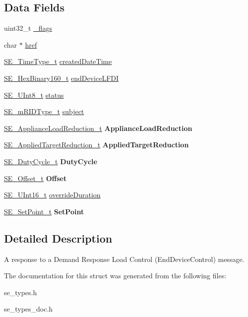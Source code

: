 \subsection*{Data Fields}
\begin{DoxyCompactItemize}
\item 
uint32\+\_\+t \hyperlink{group__DrResponse_ga3935b911a2459587ec94199037ab0e0b}{\+\_\+flags}
\item 
char $\ast$ \hyperlink{group__DrResponse_gad93328683bc0ae7951dd64d6d9ef75d6}{href}
\item 
\hyperlink{group__TimeType_ga6fba87a5b57829b4ff3f0e7638156682}{S\+E\+\_\+\+Time\+Type\+\_\+t} \hyperlink{group__DrResponse_gadaad04b0b35d8f1e04852a97853ff85a}{created\+Date\+Time}
\item 
\hyperlink{group__HexBinary160_ga92b92aa55555bdb75f3a59060f2c1632}{S\+E\+\_\+\+Hex\+Binary160\+\_\+t} \hyperlink{group__DrResponse_ga71a72ff947c30daf23717299c9bec0b4}{end\+Device\+L\+F\+DI}
\item 
\hyperlink{group__UInt8_gaf7c365a1acfe204e3a67c16ed44572f5}{S\+E\+\_\+\+U\+Int8\+\_\+t} \hyperlink{group__DrResponse_gacdaed09d4ca83cb5ca0c9a05403d075c}{status}
\item 
\hyperlink{group__mRIDType_gac74622112f3a388a2851b2289963ba5e}{S\+E\+\_\+m\+R\+I\+D\+Type\+\_\+t} \hyperlink{group__DrResponse_gac4dc2f090a45b58f5379fc0566b52b3e}{subject}
\item 
\hyperlink{structSE__ApplianceLoadReduction__t}{S\+E\+\_\+\+Appliance\+Load\+Reduction\+\_\+t} {\bfseries Appliance\+Load\+Reduction}
\item 
\hyperlink{structSE__AppliedTargetReduction__t}{S\+E\+\_\+\+Applied\+Target\+Reduction\+\_\+t} {\bfseries Applied\+Target\+Reduction}
\item 
\hyperlink{structSE__DutyCycle__t}{S\+E\+\_\+\+Duty\+Cycle\+\_\+t} {\bfseries Duty\+Cycle}
\item 
\hyperlink{structSE__Offset__t}{S\+E\+\_\+\+Offset\+\_\+t} {\bfseries Offset}
\item 
\hyperlink{group__UInt16_gac68d541f189538bfd30cfaa712d20d29}{S\+E\+\_\+\+U\+Int16\+\_\+t} \hyperlink{group__DrResponse_ga0a4b25f83bac9e055e0842839953b1da}{override\+Duration}
\item 
\hyperlink{structSE__SetPoint__t}{S\+E\+\_\+\+Set\+Point\+\_\+t} {\bfseries Set\+Point}
\end{DoxyCompactItemize}


\subsection{Detailed Description}
A response to a Demand Response Load Control (End\+Device\+Control) message. 

The documentation for this struct was generated from the following files\+:\begin{DoxyCompactItemize}
\item 
se\+\_\+types.\+h\item 
se\+\_\+types\+\_\+doc.\+h\end{DoxyCompactItemize}
